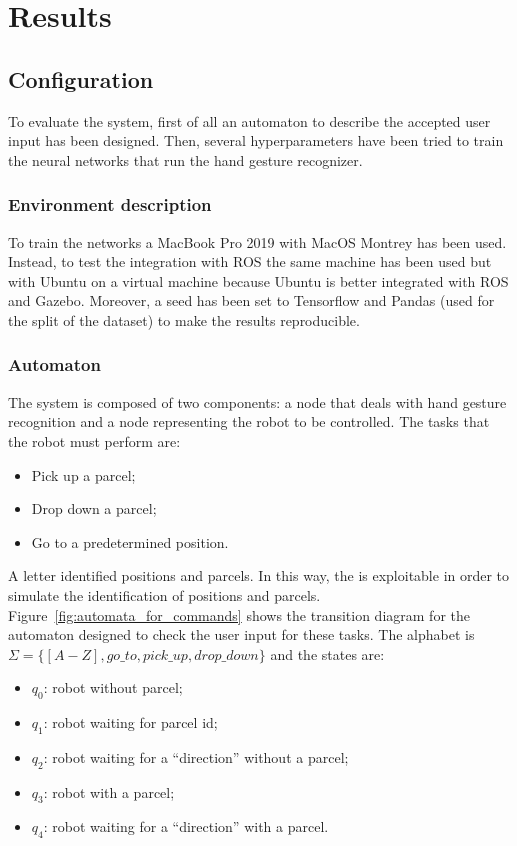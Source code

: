 \documentclass[../thesis.tex]{subfiles}
\begin{document}
\chapter{Results}\label{cap:results}
\section{Configuration}
To evaluate the system, first of all an automaton to describe the accepted user input has been designed. Then, several hyperparameters have been tried to train the neural networks that run the hand gesture recognizer.

\subsection{Environment description}
To train the networks a MacBook Pro 2019 with MacOS Montrey has been used. Instead, to test the integration with ROS the same machine has been used but with Ubuntu on a virtual machine because Ubuntu is better integrated with \acrshort{ROS} and Gazebo. Moreover, a seed has been set to Tensorflow and Pandas (used for the split of the dataset) to make the results reproducible.

\subsection{Automaton}
The system is composed of two components: a node that deals with  hand gesture recognition and a node representing the robot to be controlled. The tasks that the robot must perform are:
\begin{itemize}
    \item Pick up a parcel;
    \item Drop down a parcel;
    \item Go to a predetermined position.
\end{itemize}
A letter identified positions and parcels. In this way, the  is exploitable in order to simulate the identification of positions and parcels.\\
Figure~\ref{fig:automata_for_commands} shows the transition diagram for the automaton designed to check the user input for these tasks. The alphabet is $\Sigma = \{[A-Z], go\_to, pick\_up, drop\_down\}$ and the states are:
\begin{itemize}
    \item \textbf{$q_0$}: robot without parcel; 
    \item \textbf{$q_1$}: robot waiting for parcel id; 
    \item \textbf{$q_2$}: robot waiting for a ``direction'' without a parcel;
    \item \textbf{$q_3$}: robot with a parcel;
    \item \textbf{$q_4$}: robot waiting for a ``direction'' with a parcel.
\end{itemize}
\end{document}

